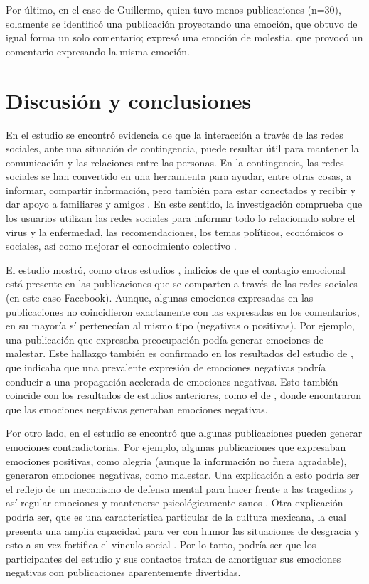 \documentclass{textolivre}
\begin{document}
Por último, en el caso de Guillermo, quien tuvo menos publicaciones (n=30), solamente se identificó una publicación proyectando una emoción, que obtuvo de igual forma un solo comentario; expresó una emoción de molestia, que provocó un comentario expresando la misma emoción. 


\section{Discusión y conclusiones}

En el estudio se encontró evidencia de que la interacción a través de las redes sociales, ante una situación de contingencia, puede resultar útil para mantener la comunicación y las relaciones entre las personas. En la contingencia, las redes sociales se han convertido en una herramienta para ayudar, entre otras cosas, a informar, compartir información, pero también para estar conectados y recibir y dar apoyo a familiares y amigos \cite{saud2020}. En este sentido, la investigación comprueba que los usuarios utilizan las redes sociales para informar todo lo relacionado sobre el virus y la enfermedad, las recomendaciones, los temas políticos, económicos o sociales, así como mejorar el conocimiento colectivo \cite{saud2020}. 

El estudio mostró, como otros estudios \cite{rosenbusch2019,guo2020,sasaki2021}, indicios de que el contagio emocional está presente en las publicaciones que se comparten a través de las redes sociales (en este caso Facebook). Aunque, algunas emociones expresadas en las publicaciones no coincidieron exactamente con las expresadas en los comentarios, en su mayoría sí pertenecían al mismo tipo (negativas o positivas). Por ejemplo, una publicación que expresaba preocupación podía generar emociones de malestar. Este hallazgo también es confirmado en los resultados del estudio de \textcite{goldenberg2020}, que indicaba que una prevalente expresión de emociones negativas podría conducir a una propagación acelerada de emociones negativas. Esto también coincide con los resultados de estudios anteriores, como el de \textcite{hatfield1993}, donde encontraron que las emociones negativas generaban emociones negativas.

Por otro lado, en el estudio se encontró que algunas publicaciones pueden generar emociones contradictorias. Por ejemplo, algunas publicaciones que expresaban emociones positivas, como alegría (aunque la información no fuera agradable), generaron emociones negativas, como malestar. Una explicación a esto podría ser el reflejo de un mecanismo de defensa mental para hacer frente a las tragedias \cite{dundes1987} y así regular emociones y mantenerse psicológicamente sanos \cite{Bazarova2015,iglesiasSanchez2020}. Otra explicación podría ser, que es una característica particular de la cultura mexicana, la cual presenta una amplia capacidad para ver con humor las situaciones de desgracia \cite{ruiz2018} y esto a su vez fortifica el vínculo social \cite{yus2018}. Por lo tanto, podría ser que los participantes del estudio y sus contactos tratan de amortiguar sus emociones negativas con publicaciones aparentemente divertidas. 
\end{document}
